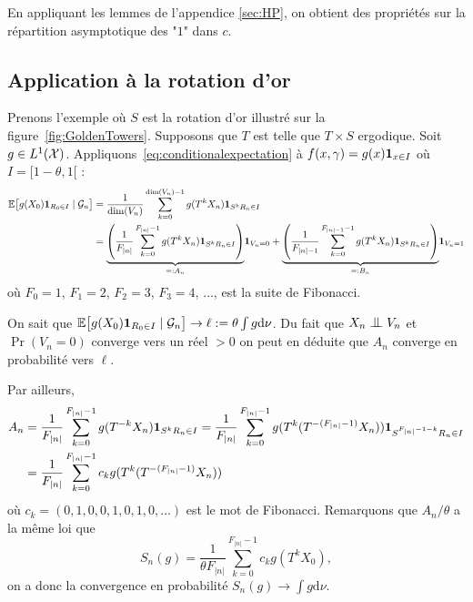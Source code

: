 \documentclass[12pt,a4paper]{article}
\begin{document}
En appliquant les lemmes de l'appendice \ref{sec:HP}, on obtient des 
propriétés sur la répartition asymptotique des "$1$" dans $c$. 

\subsection{Application à la rotation d'or}

Prenons l'exemple où $S$ est la rotation d'or illustré sur la figure~\ref{fig:GoldenTowers}. 
Supposons que $T$ est telle que $T \times S$ ergodique. 
Soit $g \in L^1(\mathcal{X})$. 
Appliquons~\eqref{eq:conditionalexpectation} à 
$f(x,\gamma) = g(x)\boldsymbol 1_{x \in I}$ où $I=[1-\theta, 1[$ :
\begin{align*}
\mathbb{E}\bigl[g(X_0) \boldsymbol 1_{R_0 \in I} \mid \mathcal{G}_n\bigr]
&  = \frac{1}{\dim(V_n)}\sum_{k=0}^{\dim(V_n)-1} g(T^kX_n) \boldsymbol 1_{S^k R_n \in I} \\
& = \underset{=:A_n}{\underbrace{\left(\frac{1}{F_{|n|}}\sum_{k=0}^{F_{|n|}-1} g(T^kX_n) \boldsymbol 1_{S^k R_n \in I}\right)}}\boldsymbol 1_{V_n=0} 
+ \underset{=:B_n}{\underbrace{\left(\frac{1}{F_{|n|-1}}\sum_{k=0}^{F_{|n|-1}-1} g(T^kX_n) \boldsymbol 1_{S^k R_n \in I}\right)}}\boldsymbol 1_{V_n=1}
\end{align*}
où $F_0=1$, $F_1=2$, $F_2=3$, $F_3=4$, $\ldots$, est la suite de Fibonacci. 

On sait que 
$\mathbb{E}\bigl[g(X_0) \boldsymbol 1_{R_0 \in I} \mid \mathcal{G}_n\bigr] \to \ell:= \theta\int g \mathrm{d}\nu$. 
Du fait que $X_n \indep V_n$  et $\Pr(V_n=0)$ converge vers un réel $>0$ on peut en 
déduite que $A_n$ converge en probabilité vers $\ell$. 

%
Par ailleurs, 
\begin{align*}
A_n & = \frac{1}{F_{|n|}}\sum_{k=0}^{F_{|n|}-1} g(T^{-k}X_n) \boldsymbol 1_{S^k R_n \in I}
  = \frac{1}{F_{|n|}}\sum_{k=0}^{F_{|n|}-1} g(T^k(T^{-(F_{|n|}-1)}X_n)) \boldsymbol 1_{S^{F_{|n|}-1-k} R_n \in I} 
 \\ & = \frac{1}{F_{|n|}}\sum_{k=0}^{F_{|n|}-1} c_k g(T^k(T^{-(F_{|n|}-1)}X_n)) 
\end{align*}
où $c_k = (0, 1, 0, 0, 1, 0, 1, 0, \ldots)$ est le mot de Fibonacci.
Remarquons que $A_n/\theta$ a la même loi que 
$$
S_n(g) = \frac{1}{\theta F_{|n|}}\sum_{k=0}^{F_{|n|}-1} c_k g(T^kX_0),  
$$
on a donc la convergence en probabilité $S_n(g) \to \int g \mathrm{d}\nu$. 
\end{document}
